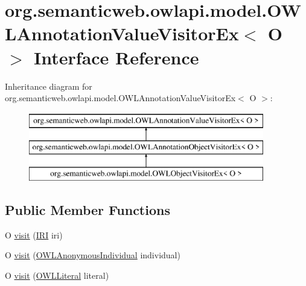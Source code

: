 \hypertarget{interfaceorg_1_1semanticweb_1_1owlapi_1_1model_1_1_o_w_l_annotation_value_visitor_ex_3_01_o_01_4}{\section{org.\-semanticweb.\-owlapi.\-model.\-O\-W\-L\-Annotation\-Value\-Visitor\-Ex$<$ O $>$ Interface Reference}
\label{interfaceorg_1_1semanticweb_1_1owlapi_1_1model_1_1_o_w_l_annotation_value_visitor_ex_3_01_o_01_4}
}
Inheritance diagram for org.\-semanticweb.\-owlapi.\-model.\-O\-W\-L\-Annotation\-Value\-Visitor\-Ex$<$ O $>$\-:\begin{figure}[H]
\begin{center}
\leavevmode
\includegraphics[height=3.000000cm]{interfaceorg_1_1semanticweb_1_1owlapi_1_1model_1_1_o_w_l_annotation_value_visitor_ex_3_01_o_01_4}
\end{center}
\end{figure}
\subsection*{Public Member Functions}
\begin{DoxyCompactItemize}
\item 
O \hyperlink{interfaceorg_1_1semanticweb_1_1owlapi_1_1model_1_1_o_w_l_annotation_value_visitor_ex_3_01_o_01_4_acad008bdf2e6b3bf4edc0489226fe10a}{visit} (\hyperlink{classorg_1_1semanticweb_1_1owlapi_1_1model_1_1_i_r_i}{I\-R\-I} iri)
\item 
O \hyperlink{interfaceorg_1_1semanticweb_1_1owlapi_1_1model_1_1_o_w_l_annotation_value_visitor_ex_3_01_o_01_4_a599b6d4065eb4ed00b1480552de2345b}{visit} (\hyperlink{interfaceorg_1_1semanticweb_1_1owlapi_1_1model_1_1_o_w_l_anonymous_individual}{O\-W\-L\-Anonymous\-Individual} individual)
\item 
O \hyperlink{interfaceorg_1_1semanticweb_1_1owlapi_1_1model_1_1_o_w_l_annotation_value_visitor_ex_3_01_o_01_4_a3ebb6da4fa88a93fdfc2bcd1687985d5}{visit} (\hyperlink{interfaceorg_1_1semanticweb_1_1owlapi_1_1model_1_1_o_w_l_literal}{O\-W\-L\-Literal} literal)
\end{DoxyCompactItemize}



